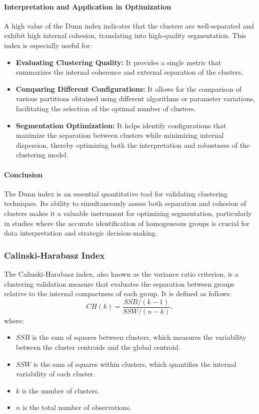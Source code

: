 \documentclass[10pt]{article}
\begin{document}
\paragraph{Interpretation and Application in Optimization}  
A high value of the Dunn index indicates that the clusters are well-separated and exhibit high internal cohesion, translating into high-quality segmentation. This index is especially useful for:
\begin{itemize}
    \item \textbf{Evaluating Clustering Quality:} It provides a single metric that summarizes the internal coherence and external separation of the clusters.
    \item \textbf{Comparing Different Configurations:} It allows for the comparison of various partitions obtained using different algorithms or parameter variations, facilitating the selection of the optimal number of clusters.
    \item \textbf{Segmentation Optimization:} It helps identify configurations that maximize the separation between clusters while minimizing internal dispersion, thereby optimizing both the interpretation and robustness of the clustering model.
\end{itemize}

\paragraph{Conclusion}  
The Dunn index is an essential quantitative tool for validating clustering techniques. Its ability to simultaneously assess both separation and cohesion of clusters makes it a valuable instrument for optimizing segmentation, particularly in studies where the accurate identification of homogeneous groups is crucial for data interpretation and strategic decision-making.

\subsubsection{Calinski-Harabasz Index}
The Calinski-Harabasz index, also known as the variance ratio criterion, is a clustering validation measure that evaluates the separation between groups relative to the internal compactness of each group. It is defined as follows:
\[
CH(k) = \frac{SSB/(k-1)}{SSW/(n-k)},
\]
where:
\begin{itemize}
    \item $SSB$ is the sum of squares between clusters, which measures the variability between the cluster centroids and the global centroid.
    \item $SSW$ is the sum of squares within clusters, which quantifies the internal variability of each cluster.
    \item $k$ is the number of clusters.
    \item $n$ is the total number of observations.
\end{itemize}
\end{document}
